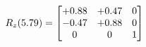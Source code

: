 \documentclass[preview]{standalone}
\begin{document}
\begin{align*}
\special{dvisvgm:raw <g id='unique000'>}R_{z}(5.79) = \begin{bmatrix}+0.88 & +0.47 & 0 \\-0.47 & +0.88 & 0 \\0 & 0 & 1\end{bmatrix}\special{dvisvgm:raw </g>}
\end{align*}
\end{document}
